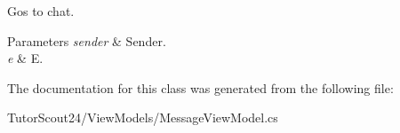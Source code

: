 Gos to chat. 


\begin{DoxyParams}{Parameters}
{\em sender} & Sender.\\
\hline
{\em e} & E.\\
\hline
\end{DoxyParams}


The documentation for this class was generated from the following file\+:\begin{DoxyCompactItemize}
\item 
Tutor\+Scout24/\+View\+Models/Message\+View\+Model.\+cs\end{DoxyCompactItemize}
